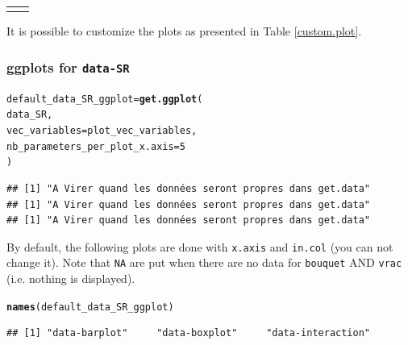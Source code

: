 \documentclass{article}\usepackage[]{graphicx}\usepackage[]{color}
\makeatletter
\newcommand{\hlnum}[1]{\textcolor[rgb]{0.686,0.059,0.569}{#1}}%
\newcommand{\hlstd}[1]{\textcolor[rgb]{0.345,0.345,0.345}{#1}}%
\newcommand{\hlkwb}[1]{\textcolor[rgb]{0.69,0.353,0.396}{#1}}%
\newcommand{\hlkwc}[1]{\textcolor[rgb]{0.333,0.667,0.333}{#1}}%
\newcommand{\hlkwd}[1]{\textcolor[rgb]{0.737,0.353,0.396}{\textbf{#1}}}%
\newenvironment{kframe}{%
 \def\at@end@of@kframe{}%
 \ifinner\ifhmode%
  \def\at@end@of@kframe{\end{minipage}}%
  \begin{minipage}{\columnwidth}%
 \fi\fi%
 \def\FrameCommand##1{\hskip\@totalleftmargin \hskip-\fboxsep
 \colorbox{shadecolor}{##1}\hskip-\fboxsep
     \hskip-\linewidth \hskip-\@totalleftmargin \hskip\columnwidth}%
 \MakeFramed {\advance\hsize-\width
   \@totalleftmargin\z@ \linewidth\hsize
   \@setminipage}}%
 {\par\unskip\endMakeFramed%
 \at@end@of@kframe}
\newenvironment{knitrout}{}{} %
\makeatother
\begin{document}
\begin{center}
\begin{tabular}{cc}
\begin{knitrout}
{}



\end{knitrout}
&
\\
\end{tabular}
\end{center}

It is possible to customize the plots as presented in Table \ref{custom.plot}.

\subsubsection{ggplots for \texttt{data-SR} }

\begin{knitrout}
\color{fgcolor}\begin{kframe}
\begin{alltt}
\hlstd{default_data_SR_ggplot} \hlkwb{=} \hlkwd{get.ggplot}\hlstd{(}
        \hlstd{data_SR,}
        \hlkwc{vec_variables} \hlstd{= plot_vec_variables,}
        \hlkwc{nb_parameters_per_plot_x.axis} \hlstd{=} \hlnum{5}
        \hlstd{)}
\end{alltt}


{\ttfamily\noindent\itshape{}}\begin{verbatim}
## [1] "A Virer quand les données seront propres dans get.data"
## [1] "A Virer quand les données seront propres dans get.data"
## [1] "A Virer quand les données seront propres dans get.data"
\end{verbatim}
\end{kframe}
\end{knitrout}

By default, the following plots are done with \texttt{x.axis} and \texttt{in.col} (you can not change it).
Note that \texttt{NA} are put when there are no data for \texttt{bouquet} AND \texttt{vrac} (i.e. nothing is displayed).

\begin{knitrout}
\color{fgcolor}\begin{kframe}
\begin{alltt}
\hlkwd{names}\hlstd{(default_data_SR_ggplot)}
\end{alltt}
\begin{verbatim}
## [1] "data-barplot"     "data-boxplot"     "data-interaction"
\end{verbatim}
\end{kframe}
\end{knitrout}
\end{document}
